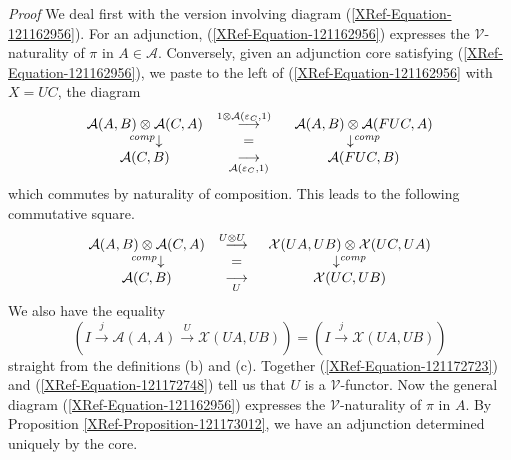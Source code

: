 \documentclass{amsart}
\theoremstyle{definition}
\theoremstyle{remark}
\numberwithin{equation}{section}
\begin{document}
{\itshape Proof} We deal first with the version involving diagram
(\ref{XRef-Equation-121162956}). For an adjunction, (\ref{XRef-Equation-121162956})
expresses the $\mathcal{V}$-naturality of $\pi $ in $A\in \mathcal{A}$.
Conversely, given an adjunction core satisfying (\ref{XRef-Equation-121162956}),
we paste to the left of (\ref{XRef-Equation-121162956} with $X =U
C$, the diagram 
\begin{equation}
\begin{array}{ccc}
 \mathcal{A}( A,B) \otimes \mathcal{A}( C,A)  & \overset{1\otimes
\mathcal{A}( \varepsilon _{C},1) \ \ }{\longrightarrow } & \mathcal{A}(
A,B) \otimes \mathcal{A}( F U C,A)  \\
 \left. {}{}^{\mathit{comp}}\right\downarrow   & = & \downarrow
^{\mathit{comp}} \\
 \mathcal{A}( C,B)  & \operatorname*{\longrightarrow }\limits_{\ \ \mathcal{A}(
\varepsilon _{C},1) \ \ } & \mathcal{A}( F U C,B) 
\end{array}
\end{equation}
which commutes by naturality of composition. This leads to the following
commutative square.
\begin{equation}
\begin{array}{ccc}
 \mathcal{A}( A,B) \otimes \mathcal{A}( C,A)  & \overset{U\otimes
U\ \ }{\longrightarrow } & \mathcal{X}( U A,U B) \otimes \mathcal{X}(
U C,U A)  \\
 \left. {}{}^{\mathit{comp}}\right\downarrow   & = & \downarrow
^{\mathit{comp}} \\
 \mathcal{A}( C,B)  & \operatorname*{\longrightarrow }\limits_{\ \ U\ \ }
& \mathcal{X}( U C,U B) 
\end{array}%
\label{XRef-Equation-121172723}
\end{equation}
We also have the equality
\begin{equation}
\left( I\overset{j}{\longrightarrow }\mathcal{A}( A,A) \overset{U}{\longrightarrow
}\mathcal{X}( U A,U B) \right) =\left( I\overset{j}{\longrightarrow
}\mathcal{X}( U A,U B) \right) %
\label{XRef-Equation-121172748}
\end{equation}
straight from the definitions (b) and (c). Together (\ref{XRef-Equation-121172723})
and (\ref{XRef-Equation-121172748}) tell us that $U$ is a $\mathcal{V}$-functor.
Now the general diagram (\ref{XRef-Equation-121162956}) expresses
the $\mathcal{V}$-naturality of $\pi $ in $A$. By Proposition \ref{XRef-Proposition-121173012},
we have an adjunction determined uniquely by the core.
\end{document}
